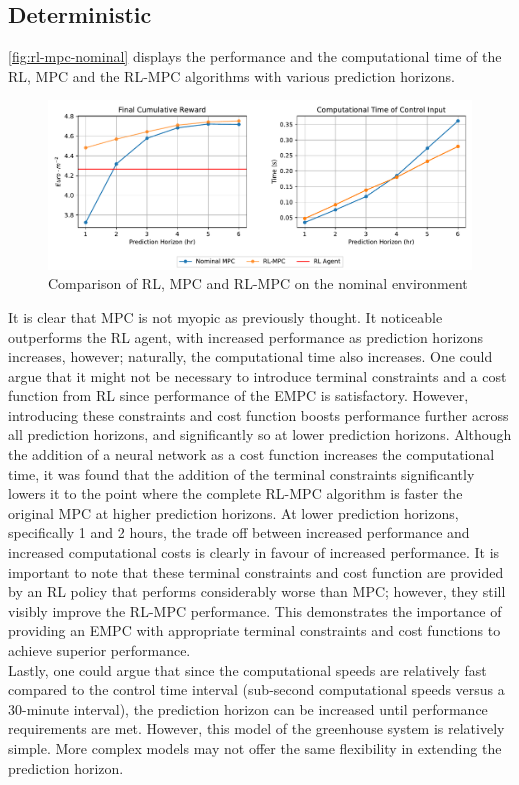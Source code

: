 \subsection{Deterministic}
 \autoref{fig:rl-mpc-nominal} displays the performance and the computational time of the RL, MPC and the RL-MPC algorithms with various prediction horizons. 
\begin{figure}[h]
	\centering
	\includegraphics[width=\linewidth]{figures/rl_mpc_impl_final_research.pdf}
	\caption{Comparison of RL, MPC and RL-MPC on the nominal environment}
	\label{fig:rl-mpc-nominal}
\end{figure}
 It is clear that MPC is not myopic as previously thought. It noticeable outperforms the RL agent, with increased performance as prediction horizons increases, however; naturally, the computational time also increases. One could argue that it might not be necessary to introduce terminal constraints and a cost function from RL since performance of the EMPC is satisfactory. However, introducing these constraints and cost function boosts performance further across all prediction horizons, and significantly so at lower prediction horizons. Although the addition of a neural network as a cost function increases the computational time, it was found that the addition of the terminal constraints significantly lowers it to the point where the complete RL-MPC algorithm is faster the original MPC at higher prediction horizons. At lower prediction horizons, specifically 1 and 2 hours, the trade off between increased performance and increased computational costs is clearly in favour of increased performance. It is important to note that these terminal constraints and cost function are provided by an RL policy that performs considerably worse than MPC; however, they still visibly improve the RL-MPC performance. This demonstrates the importance of providing an EMPC with appropriate terminal constraints and cost functions to achieve superior performance.\\  
Lastly, one could argue that since the computational speeds are relatively fast compared to the control time interval (sub-second computational speeds versus a 30-minute interval), the prediction horizon can be increased until performance requirements are met. However, this model of the greenhouse system is relatively simple. More complex models may not offer the same flexibility in extending the prediction horizon.

